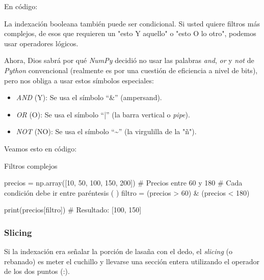En código:


La indexación booleana también puede ser condicional. Si usted quiere filtros más complejos, de esos que requieren un "esto Y aquello" o "esto O lo otro", podemos usar operadores lógicos.

Ahora, Dios sabrá por qué \textit{NumPy} decidió no usar las palabras \textit{and}, \textit{or} y \textit{not} de \textit{Python} convencional (realmente es por una cuestión de eficiencia a nivel de bits), pero nos obliga a usar estos símbolos especiales:

\begin{itemize}
\item \textit{AND} (Y): Se usa el símbolo ``\&'' (ampersand).
\item \textit{OR} (O): Se usa el símbolo ``|'' (la barra vertical o \textit{pipe}).
\item \textit{NOT} (NO): Se usa el símbolo ``\textasciitilde'' (la virgulilla de la "ñ").
\end{itemize}

Veamos esto en código:

\begin{pycode}{Filtros complejos}

precios = np.array([10, 50, 100, 150, 200])
# Precios entre 60 y 180
# Cada condición debe ir entre paréntesis ( )
filtro = (precios > 60) & (precios < 180)

print(precios[filtro]) # Resultado: [100, 150]

\end{pycode}



\subsubsection{Slicing}
Si la indexación era señalar la porción de lasaña con el dedo, el \textit{slicing} (o rebanado) es meter el cuchillo y llevarse una sección entera utilizando el operador de los dos puntos (:).

